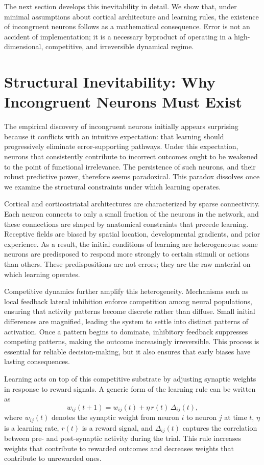 \documentclass[11pt]{article}
\begin{document}
The next section develops this inevitability in detail. We show that, under minimal assumptions about cortical architecture and learning rules, the existence of incongruent neurons follows as a mathematical consequence. Error is not an accident of implementation; it is a necessary byproduct of operating in a high-dimensional, competitive, and irreversible dynamical regime.

\section{Structural Inevitability: Why Incongruent Neurons Must Exist}

The empirical discovery of incongruent neurons initially appears surprising because it conflicts with an intuitive expectation: that learning should progressively eliminate error-supporting pathways. Under this expectation, neurons that consistently contribute to incorrect outcomes ought to be weakened to the point of functional irrelevance. The persistence of such neurons, and their robust predictive power, therefore seems paradoxical. This paradox dissolves once we examine the structural constraints under which learning operates.

Cortical and corticostriatal architectures are characterized by sparse connectivity. Each neuron connects to only a small fraction of the neurons in the network, and these connections are shaped by anatomical constraints that precede learning. Receptive fields are biased by spatial location, developmental gradients, and prior experience. As a result, the initial conditions of learning are heterogeneous: some neurons are predisposed to respond more strongly to certain stimuli or actions than others. These predispositions are not errors; they are the raw material on which learning operates.

Competitive dynamics further amplify this heterogeneity. Mechanisms such as local feedback lateral inhibition enforce competition among neural populations, ensuring that activity patterns become discrete rather than diffuse. Small initial differences are magnified, leading the system to settle into distinct patterns of activation. Once a pattern begins to dominate, inhibitory feedback suppresses competing patterns, making the outcome increasingly irreversible. This process is essential for reliable decision-making, but it also ensures that early biases have lasting consequences.

Learning acts on top of this competitive substrate by adjusting synaptic weights in response to reward signals. A generic form of the learning rule can be written as
\[
w_{ij}(t+1) = w_{ij}(t) + \eta \, r(t) \, \Delta_{ij}(t),
\]
where $w_{ij}(t)$ denotes the synaptic weight from neuron $i$ to neuron $j$ at time $t$, $\eta$ is a learning rate, $r(t)$ is a reward signal, and $\Delta_{ij}(t)$ captures the correlation between pre- and post-synaptic activity during the trial. This rule increases weights that contribute to rewarded outcomes and decreases weights that contribute to unrewarded ones.
\end{document}
